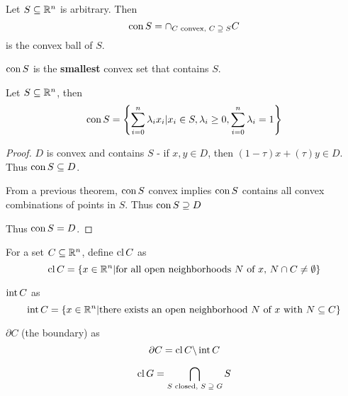 \begin{defn}
  \label{defn:convexity:8}
  Let $S \subseteq \mathbb{R}^{n}$ is arbitrary. Then
  \begin{equation}
    \label{eq:21}
  \operatorname*{con} S = \cap_{\text{$C$ convex, $C \supseteq S$}} C  
  \end{equation}
  is the convex ball of $S$.
\end{defn}

\begin{remark}
  $\operatorname*{con} S$ is the \textbf{smallest} convex set that contains $S$.
\end{remark}

\begin{thm}
  \label{defn:convexity:9}
  Let $S \subseteq \mathbb{R}^{n}$, then
  \begin{equation}
    \label{eq:22}
    \operatorname*{con} S = \left\{ \sum_{i=0}^{n} \lambda_{i} x_{i} | x_{i} \in S,
    \lambda_{i} \geq 0, \sum_{i=0}^{n} \lambda_{i} = 1 \right\}
  \end{equation}
\end{thm}

\begin{proof}
  $D$ is convex and contains $S$ - if $x, y \in D$, then $(1-\tau)x +
  (\tau)y \in D$.  Thus $\operatorname*{con} S \subseteq D$.

  From a previous theorem, $\operatorname*{con} S$ convex implies $\operatorname*{con} S$ contains all
  convex combinations of points in $S$.  Thus $\operatorname*{con} S \supseteq D$

  Thus $\operatorname*{con} S = D$.
\end{proof}

\begin{defn}
  \label{defn:convexity:10}
  For a set $C \subseteq \mathbb{R}^{n}$, define $\operatorname*{cl} C$ as
  \begin{equation}
    \label{eq:23}
    \operatorname*{cl} C = \{ x \in \mathbb{R}^{n} | \text{for all open neighborhoods $N$ of
      $x$, $N \cap C \neq \emptyset$} \}
  \end{equation}

  $\operatorname*{int} C$ as
  \begin{equation}
    \label{eq:24}
    \operatorname*{int} C = \{ x \in \mathbb{R}^{n} | \text{there exists an open neighborhood $N$ of
      $x$ with $N \subseteq C$} \}
  \end{equation}

  $\partial C$ (the boundary) as
  \begin{equation}
    \label{eq:25}
    \partial C = \operatorname*{cl} C \backslash \operatorname*{int} C
  \end{equation}
\end{defn}

\begin{remark}
  \begin{equation}
    \label{eq:26}
    \operatorname*{cl} G = \bigcap_{\text{$S$ closed, $S \supseteq G$}} S
  \end{equation}
\end{remark}

